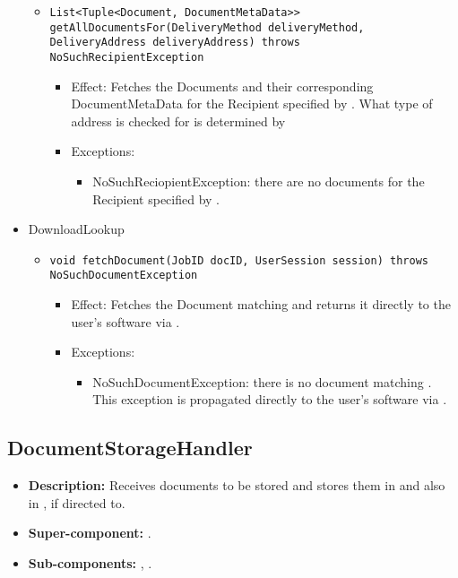 \begin{itemize}
\begin{itemize}
		\item \texttt{List<Tuple<Document, DocumentMetaData>> getAllDocumentsFor(DeliveryMethod deliveryMethod, DeliveryAddress deliveryAddress) throws NoSuchRecipientException}
		\begin{itemize}
			\item Effect: Fetches the Documents and their corresponding DocumentMetaData for the Recipient specified by . What type of address is checked for is determined by 
			\item Exceptions: 
			\begin{itemize}
				\item NoSuchReciopientException: there are no documents for the Recipient specified by .
			\end{itemize}
		\end{itemize}
	\end{itemize}

    \item DownloadLookup
	\begin{itemize}
		\item \texttt{void fetchDocument(JobID docID, UserSession session) throws NoSuchDocumentException}
		\begin{itemize}
			\item Effect: Fetches the Document matching  and returns it directly to the user's software via .
			\item Exceptions:
			\begin{itemize}
				\item NoSuchDocumentException: there is no document matching . This exception is propagated directly to the user's software via .
			\end{itemize}
		\end{itemize}
	\end{itemize}
\end{itemize}

\subsection{DocumentStorageHandler} 
\begin{itemize}
    \item \textbf{Description:} Receives documents to be stored and stores them in  and also in , if directed to.
    \item \textbf{Super-component:} .
    \item \textbf{Sub-components:} , .
\end{itemize}

